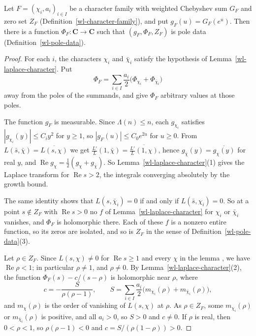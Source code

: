 \begin{proposition}\label{wl-pole-data-family}
Let $F=(\chi_i,a_i)_{i\in I}$ be a character family with weighted Chebyshev
sum $G_F$ and zero set $Z_F$ (Definition~\ref{wl-character-family}), and put
$g_F(u)=G_F(e^u)$. Then there is a function $\Phi_F:\mathbf C\to\mathbf C$
such that $(g_F,\Phi_F,Z_F)$ is pole data (Definition~\ref{wl-pole-data}).
\end{proposition}
\begin{proof}
For each $i$, the characters $\chi_i$ and $\bar\chi_i$ satisfy the hypothesis
of Lemma~\ref{wl-laplace-character}. Put
\[
 \Phi_F=\sum_{i\in I}\frac{a_i}2\bigl(\Phi_{\chi_i}+\Phi_{\bar\chi_i}\bigr)
\]
away from the poles of the summands, and give $\Phi_F$ arbitrary values at
those poles.

The function $g_F$ is measurable. Since $\Lambda(n)\leq n$, each $g_{\chi_i}$
satisfies $|g_{\chi_i}(y)|\leq C_iy^2$ for $y\geq1$, so
$|g_F(u)|\leq C_0e^{2u}$ for $u\geq0$. From
$L(\bar s,\bar\chi)=\overline{L(s,\chi)}$ we get
$\frac{L'}{L}(1,\bar\chi)=\overline{\frac{L'}{L}(1,\chi)}$, hence
$g_{\bar\chi}(y)=\overline{g_\chi(y)}$ for real $y$, and
$\operatorname{Re}g_\chi=\frac12(g_\chi+g_{\bar\chi})$. So
Lemma~\ref{wl-laplace-character}(1) gives the Laplace transform for
$\operatorname{Re}s>2$, the integrals converging absolutely by the growth
bound.

The same identity shows that $L(s,\bar\chi_i)=0$ if and only if
$L(\bar s,\chi_i)=0$. So at a point $s\notin Z_F$ with $\operatorname{Re}s>0$
no $f$ of Lemma~\ref{wl-laplace-character} for $\chi_i$ or $\bar\chi_i$
vanishes, and $\Phi_F$ is holomorphic there. Each of these $f$ is a nonzero
entire function, so its zeros are isolated, and so is $Z_F$ in the sense of
Definition~\ref{wl-pole-data}(3).

Let $\rho\in Z_F$. Since $L(s,\chi)\neq0$ for $\operatorname{Re}s\geq1$ and
every $\chi$ in the lemma \cite[Chapters 13 and 14]{Dav00}, we have
$\operatorname{Re}\rho<1$; in particular $\rho\neq1$, and $\rho\neq0$. By
Lemma~\ref{wl-laplace-character}(2), the function $\Phi_F(s)-c/(s-\rho)$ is
holomorphic near $\rho$, where
\[
 c=-\frac{S}{\rho(\rho-1)},\qquad
 S=\sum_{i\in I}\frac{a_i}2\bigl(m_{\chi_i}(\rho)+m_{\bar\chi_i}(\rho)\bigr),
\]
and $m_\chi(\rho)$ is the order of vanishing of $L(s,\chi)$ at $\rho$. As
$\rho\in Z_F$, some $m_{\chi_i}(\rho)$ or $m_{\bar\chi_i}(\rho)$ is positive,
and all $a_i>0$, so $S>0$ and $c\neq0$. If $\rho$ is real, then
$0<\rho<1$, so $\rho(\rho-1)<0$ and $c=S/(\rho(1-\rho))>0$.
\end{proof}


